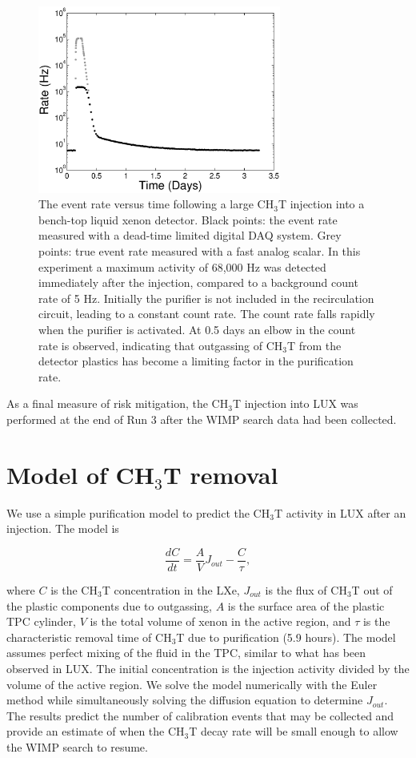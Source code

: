 \begin{figure}[h!]
\includegraphics[width=80mm]{fig/fig15.eps}
\caption{The event rate versus time following a large CH$_3$T injection into a bench-top liquid xenon detector. Black points: the event rate measured with a dead-time limited digital DAQ system. Grey points: true event rate measured with a fast analog scalar. In this experiment a maximum activity of 68,000 Hz was detected immediately after the injection, compared to a background count rate of 5 Hz. Initially the purifier is not included in the recirculation circuit, leading to a constant count rate. The count rate falls rapidly when the purifier is activated. At 0.5 days an elbow in the count rate is observed, indicating that outgassing of CH$_3$T from the detector plastics has become a limiting factor in the purification rate. }
\label{fig:Density}
\end{figure}

As a final measure of risk mitigation, the CH$_3$T injection into LUX was performed at the end of Run 3 after the WIMP search data had been collected.

\section{Model of CH$_3$T removal}
\label{sec:appendix2}

We use a simple purification model to predict the CH$_3$T activity in LUX after an injection. The model is 

\begin{equation}
\frac{dC}{dt} = \frac{A}{V}J_{out} -\frac{C}{\tau},
\end{equation}

\noindent where  $C$ is the CH$_3$T concentration in the LXe,  $J_{out}$ is the flux of CH$_3$T out of the plastic components due to outgassing,  $A$ is the surface area of the plastic TPC cylinder, $V$ is the total volume of xenon in the active region, and $\tau$ is the characteristic removal time of CH$_3$T due to purification (5.9 hours). The model assumes perfect mixing of the fluid in the TPC, similar to what has been observed in LUX. The initial concentration is the injection activity divided by the volume of the active region. We solve the model numerically with the Euler method while simultaneously solving the diffusion equation to determine $J_{out}$. The results predict the number of calibration events that may be collected and provide an estimate of when the CH$_3$T  decay rate will be small enough to allow the WIMP search to resume.

